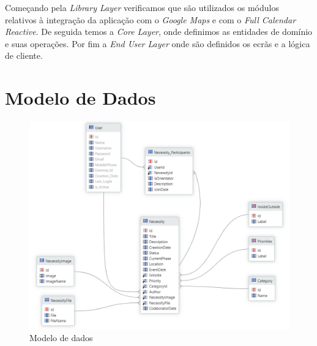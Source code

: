 Começando pela \textit{Library Layer} verificamos que são utilizados os módulos relativos à integração da aplicação 
com o \textit{Google Maps} e com o \textit{Full Calendar Reactive}. De seguida temos a \textit{ Core Layer}, 
onde definimos as entidades de domínio e suas operações. Por fim a \textit{ End User Layer} onde são definidos 
os ecrãs e a lógica de cliente. 

\section{Modelo de Dados}\label{subsec:ModeloDados}

\begin{figure}[H]
  \centering 
  \includegraphics[scale=0.4]{figures/DataModel.png}
  \caption{Modelo de dados}\label{fig:modeloDados}
\end{figure}

